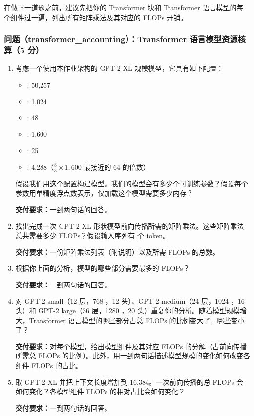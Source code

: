 在做下一道题之前，建议先把你的 Transformer 块和 Transformer 语言模型的每个组件过一遍，列出所有矩阵乘法及其对应的 FLOPs 开销。

\subsubsection*{问题（transformer\_accounting）：Transformer 语言模型资源核算（5 分）}

\begin{enumerate}
  \item[(a)] 考虑一个使用本作业架构的 GPT-2 XL 规模模型，它具有如下配置：
  \begin{itemize}
    \item {}: 50,257
    \item {}: 1,024
    \item {}: 48
    \item {}: 1,600
    \item {}: 25
    \item {}: 4,288（$\tfrac{8}{3} \times 1{,}600$ 最接近的 64 的倍数）
  \end{itemize}

  假设我们用这个配置构建模型。我们的模型会有多少个可训练参数？假设每个参数用单精度浮点数表示，仅加载这个模型需要多少内存？

  \textbf{交付要求：}一到两句话的回答。

  \item[(b)] 找出完成一次 GPT-2 XL 形状模型前向传播所需的矩阵乘法。这些矩阵乘法总共需要多少 FLOPs？假设输入序列有  个 token。

  \textbf{交付要求：}一份矩阵乘法列表（附说明）以及所需 FLOPs 的总数。

  \item[(c)] 根据你上面的分析，模型的哪些部分需要最多的 FLOPs？

  \textbf{交付要求：}一到两句话的回答。

  \item[(d)] 对 GPT-2 small（12 层，768 ，12 头）、GPT-2 medium（24 层，1024 ，16 头）和 GPT-2 large（36 层，1280 ，20 头）重复你的分析。随着模型规模增大，Transformer 语言模型的哪些部分占总 FLOPs 的比例变大了，哪些变小了？

  \textbf{交付要求：}对每个模型，给出模型组件及其对应 FLOPs 的分解（占前向传播所需总 FLOPs 的比例）。此外，用一到两句话描述模型规模的变化如何改变各组件 FLOPs 的占比。

  \item[(e)] 取 GPT-2 XL 并把上下文长度增加到 16,384。一次前向传播的总 FLOPs 会如何变化？各模型组件 FLOPs 的相对占比会如何变化？

  \textbf{交付要求：}一到两句话的回答。
\end{enumerate}

